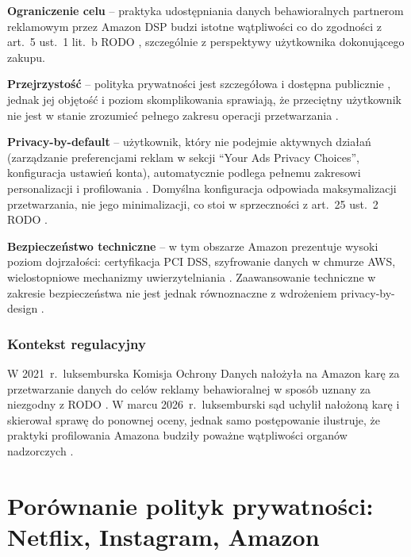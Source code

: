 \documentclass[12pt, a4paper]{article}
\begin{document}
\textbf{Ograniczenie celu} -- praktyka udostępniania danych behawioralnych partnerom reklamowym przez Amazon DSP \cite{amazon_dsp} budzi istotne wątpliwości co do zgodności z art.~5 ust.~1 lit.~b RODO \cite{rodo}, szczególnie z perspektywy użytkownika dokonującego zakupu.

\textbf{Przejrzystość} -- polityka prywatności jest szczegółowa i dostępna publicznie \cite{amazon_privacy}, jednak jej objętość i poziom skomplikowania sprawiają, że przeciętny użytkownik nie jest w stanie zrozumieć pełnego zakresu operacji przetwarzania \cite{chen2025}.

\textbf{Privacy-by-default} -- użytkownik, który nie podejmie aktywnych działań (zarządzanie preferencjami reklam w sekcji ``Your Ads Privacy Choices'', konfiguracja ustawień konta), automatycznie podlega pełnemu zakresowi personalizacji i profilowania \cite{amazon_privacy}. Domyślna konfiguracja odpowiada maksymalizacji przetwarzania, nie jego minimalizacji, co stoi w sprzeczności z art.~25 ust.~2 RODO \cite{rodo, edpb2019}.

\textbf{Bezpieczeństwo techniczne} -- w tym obszarze Amazon prezentuje wysoki poziom dojrzałości: certyfikacja PCI DSS, szyfrowanie danych w chmurze AWS, wielostopniowe mechanizmy uwierzytelniania \cite{amazon_privacy}. Zaawansowanie techniczne w zakresie bezpieczeństwa nie jest jednak równoznaczne z wdrożeniem privacy-by-design \cite{edpb2019}.

\subsubsection{Kontekst regulacyjny}

W 2021~r.\ luksemburska Komisja Ochrony Danych nałożyła na Amazon karę za przetwarzanie danych do celów reklamy behawioralnej w sposób uznany za niezgodny z RODO \cite{rodo}. W marcu 2026~r.\ luksemburski sąd uchylił nałożoną karę i skierował sprawę do ponownej oceny, jednak samo postępowanie ilustruje, że praktyki profilowania Amazona budziły poważne wątpliwości organów nadzorczych \cite{amazon_privacy}.

\newpage
\section{Porównanie polityk prywatności: Netflix, Instagram, Amazon}
\end{document}
